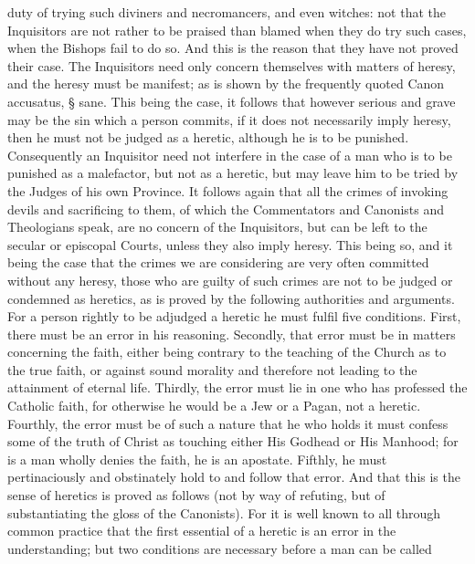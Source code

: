        duty of trying such diviners and necromancers, and even witches: not that the Inquisitors are
       not rather to be praised than blamed when they do try such cases, when the Bishops fail to
       do so. And this is the reason that they have not proved their case. The Inquisitors need only
       concern themselves with matters of heresy, and the heresy must be manifest; as is shown by
       the frequently quoted Canon accusatus, § sane.
             This being the case, it follows that however serious and grave may be the sin which a
       person commits, if it does not necessarily imply heresy, then he must not be judged as a
       heretic, although he is to be punished. Consequently an Inquisitor need not interfere in the
       case of a man who is to be punished as a malefactor, but not as a heretic, but may leave him
       to be tried by the Judges of his own Province.
             It follows again that all the crimes of invoking devils and sacrificing to them, of which
       the Commentators and Canonists and Theologians speak, are no concern of the Inquisitors,
       but can be left to the secular or episcopal Courts, unless they also imply heresy. This being
       so, and it being the case that the crimes we are considering are very often committed without
       any heresy, those who are guilty of such crimes are not to be judged or condemned as
       heretics, as is proved by the following authorities and arguments.
             For a person rightly to be adjudged a heretic he must fulfil five conditions. First, there
       must be an error in his reasoning. Secondly, that error must be in matters concerning the
       faith, either being contrary to the teaching of the Church as to the true faith, or against sound
       morality and therefore not leading to the attainment of eternal life. Thirdly, the error must lie
       in one who has professed the Catholic faith, for otherwise he would be a Jew or a Pagan, not
       a heretic. Fourthly, the error must be of such a nature that he who holds it must confess
       some of the truth of Christ as touching either His Godhead or His Manhood; for is a man
       wholly denies the faith, he is an apostate. Fifthly, he must pertinaciously and obstinately
       hold to and follow that error. And that this is the sense of heretics is proved as follows (not
       by way of refuting, but of substantiating the gloss of the Canonists).
             For it is well known to all through common practice that the first essential of a heretic
       is an error in the understanding; but two conditions are necessary before a man can be called
